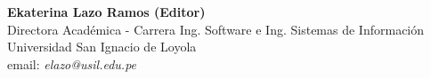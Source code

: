 \begin{center}
\textbf{Ekaterina Lazo Ramos (Editor)} \\
Directora Académica - Carrera Ing. Software e Ing. Sistemas de Información \\
Universidad San Ignacio de Loyola \\
email: \textit{elazo@usil.edu.pe} \\
\end{center}
